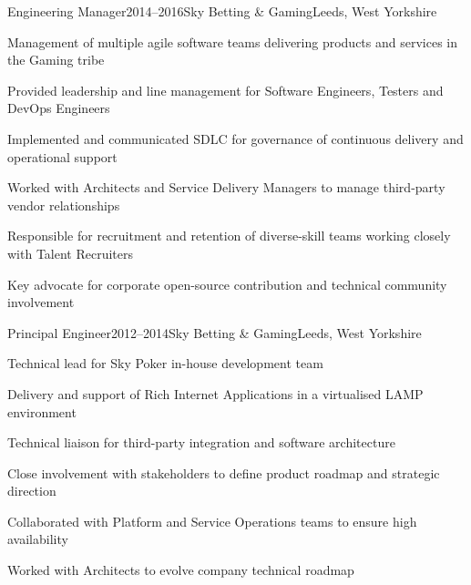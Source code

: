 \documentclass{cv}
\begin{document}

\begin{experience}{Engineering Manager}{2014--2016}{Sky Betting \& Gaming}{Leeds, West Yorkshire}
\item Management of multiple agile software teams delivering products and services in the Gaming tribe
\item Provided leadership and line management for Software Engineers, Testers and DevOps Engineers
\item Implemented and communicated SDLC for governance of continuous delivery and operational support
\item Worked with Architects and Service Delivery Managers to manage third-party vendor relationships
\item Responsible for recruitment and retention of diverse-skill teams working closely with Talent Recruiters
\item Key advocate for corporate open-source contribution and technical community involvement
\end{experience}


\begin{experience}{Principal Engineer}{2012--2014}{Sky Betting \& Gaming}{Leeds, West Yorkshire}
\item Technical lead for Sky Poker in-house development team
\item Delivery and support of Rich Internet Applications in a virtualised LAMP environment
\item Technical liaison for third-party integration and software architecture
\item Close involvement with stakeholders to define product roadmap and strategic direction
\item Collaborated with Platform and Service Operations teams to ensure high availability
\item Worked with Architects to evolve company technical roadmap
\end{experience}

\end{document}
